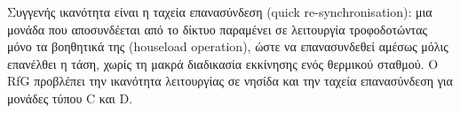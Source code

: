 Συγγενής ικανότητα είναι η ταχεία επανασύνδεση (quick re-synchronisation): μια μονάδα που
αποσυνδέεται από το δίκτυο παραμένει σε λειτουργία τροφοδοτώντας μόνο τα βοηθητικά της
(houseload operation), ώστε να επανασυνδεθεί αμέσως μόλις επανέλθει η τάση, χωρίς τη μακρά
διαδικασία εκκίνησης ενός θερμικού σταθμού. Ο RfG προβλέπει την ικανότητα λειτουργίας σε νησίδα
και την ταχεία επανασύνδεση για μονάδες τύπου C και D.

